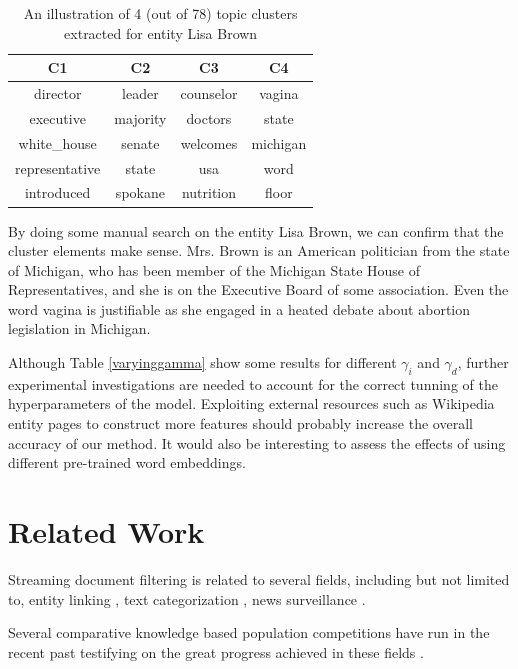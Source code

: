 \documentclass{article}
\begin{document}
\begin{table}[H]
\center
\begin{tabular}{|c|c|c|c|} \hline
\textbf{C1} & \textbf{C2} & \textbf{C3} & \textbf{C4} \\ \hline\hline
director & leader & counselor & vagina \\ \hline
executive & majority & doctors & state \\ \hline
white\_house & senate & welcomes & michigan \\ \hline
representative & state & usa & word \\ \hline
introduced & spokane & nutrition & floor \\ \hline
\end{tabular}
\caption{An illustration of 4 (out of 78) topic clusters extracted for entity Lisa Brown}
\label{clusterresult}
\end{table}

By doing some manual search on the entity Lisa Brown, we can confirm that the cluster elements make sense. Mrs. Brown is an American politician from the state of Michigan, who has been member of the Michigan State House of Representatives, and she is on the Executive Board of some association.
Even the word vagina is justifiable as she engaged in a heated debate about abortion legislation in Michigan.

Although Table \ref{varyinggamma} show some results for different $\gamma_i$ and $\gamma_d$, further experimental investigations are needed to account for the correct tunning of the hyperparameters of the model. Exploiting external resources such as Wikipedia entity pages to construct more features \cite{xitong12} should probably increase the overall accuracy of our method. It would also be interesting to assess the effects of using different pre-trained word embeddings.

\section{Related Work}
\label{related}

Streaming document filtering is related to several fields, including but not limited to, entity linking \cite{KBP11}, text categorization \cite{HLTCOE12}, news surveillance \cite{Steinberger14}.

Several comparative knowledge based population competitions have run in the recent past testifying on the great progress achieved in these fields \cite{gross_doucet_toivonen_trec12}. 
\end{document}
